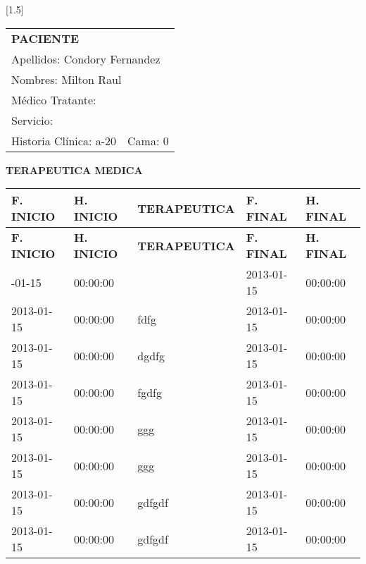 \documentclass[10pt,a4paper]{article}
\begin{document}
 
\begin{minipage}{10cm}
\end{minipage}
\hfill
\begin{minipage}{10cm}
\begin{flushleft}
\scalebox{1.4}[1.5]{
\begin{tabular}{|p{3cm}p{2.3cm}|}
\hline 
\multicolumn{2}{|l|}{\scriptsize{\textbf{PACIENTE}}}\\
\multicolumn{2}{|p{5.3cm}|}{\scriptsize{Apellidos: Condory Fernandez}}\\ 
\multicolumn{2}{|p{5.3cm}|}{\scriptsize{Nombres: Milton Raul}}\\ 
\multicolumn{2}{|p{5.3cm}|}{\scriptsize{M\'edico Tratante: }}\\ 
\hline 
\multicolumn{2}{|p{5.3cm}|}{\scriptsize{Servicio: }}\\
\hline 
\scriptsize{Historia Cl\'inica: a-20}&\scriptsize{Cama: 0} \\ 
\hline 
\end{tabular}}
\end{flushleft}
\end{minipage}

\vspace{0.3cm}
\begin{center}
\LARGE{\textbf{TERAPEUTICA MEDICA}}
\end{center}
\begin{center}
\begin{longtable}{ |p{2cm}| p{2cm}| p{8cm}| p{2cm}| p{2cm}|}
\hline
\textbf{F. INICIO} & \textbf{H. INICIO}& \textbf{TERAPEUTICA}& \textbf{F. FINAL}& \textbf{H. FINAL}\\\endfirsthead
\hline
\textbf{F. INICIO} & \textbf{H. INICIO}& \textbf{TERAPEUTICA}& \textbf{F. FINAL}& \textbf{H. FINAL}\\\hline
\endhead
\endfoot
\endlastfoot
\hline
2013-01-15&00:00:00&&2013-01-15&00:00:00\\
\hline
2013-01-15&00:00:00&fdfg&2013-01-15&00:00:00\\
\hline
2013-01-15&00:00:00&dgdfg&2013-01-15&00:00:00\\
\hline
2013-01-15&00:00:00&fgdfg&2013-01-15&00:00:00\\
\hline
2013-01-15&00:00:00&ggg&2013-01-15&00:00:00\\
\hline
2013-01-15&00:00:00&ggg&2013-01-15&00:00:00\\
\hline
2013-01-15&00:00:00&gdfgdf&2013-01-15&00:00:00\\
\hline
2013-01-15&00:00:00&gdfgdf&2013-01-15&00:00:00\\
\hline
\end{longtable}
\end{center}
\end{document}
